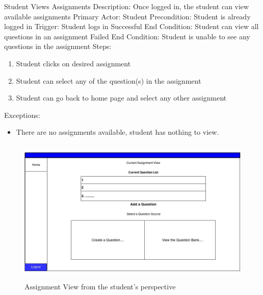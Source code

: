     \begin{section}{Student Views Assignments}
        Description: Once logged in, the student can view available assignments \newline
        Primary Actor: Student \newline
        Precondition: Student is already logged in \newline
        Trigger: Student logs in \newline
        Successful End Condition: Student can view all questions in an assignment \newline
        Failed End Condition: Student is unable to see any questions in the assignment \newline
        \newline
        Steps:
        \begin{enumerate}
            \item{Student clicks on desired assignment}
            \item{Student can select any of the question(s) in the assignment}
            \item{Student can go back to home page and select any other assignment}
        \end{enumerate}
        Exceptions:
        \begin{itemize}
            \item{There are no assignments available, student has nothing to view.}
        \end{itemize}
            \begin{figure}[H]
            \centerline{\includegraphics[height=7cm]{AssignmentView.jpg}}
            \caption{Assignment View from the student's perspective}
    \end{figure}



    \end{section}
    
